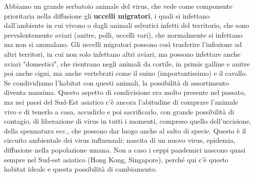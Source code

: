   Abbiamo un grande serbatoio animale del virus, che vede come
  componente prioritaria nella diffusione gli \textbf{uccelli
  migratori}, i quali si infettano dall'ambiente in cui vivono o dagli
  animali selvatici infetti del territorio, che sono prevalentemente
  aviari (anitre, polli, uccelli vari), che normalmente si infettano ma
  non si ammalano. Gli uccelli migratori possono così trasferire
  l'infezione ad altri territori, in cui non solo infettano altri
  aviari, ma possono infettare anche aviari "domestici", che rientrano
  negli animali da cortile, in primis galline e anitre poi anche cigni,
  ma anche vertebrati come il suino (importantissimo) e il cavallo. Se
  condividiamo l'habitat con questi animali, la possibilità di
  assortimento diventa massima. Questo aspetto di condivisione era molto
  presente nel passato, ma nei paesi del Sud-Est asiatico c'è ancora
  l'abitudine di comprare l'animale vivo e di tenerlo a casa, accudirlo
  e poi sacrificarlo, con grande possibilità di contagio, di liberazione
  di virus in tutti i momenti, compreso quello dell'uccisione, della
  spennatura ecc., che possono dar luogo anche al salto di specie.
  Questo è il circuito ambientale dei virus influenzali: nascita di un
  nuovo virus, epidemia, diffusione nella popolazione umana. Non a caso
  i ceppi pandemici nascono quasi sempre nel Sud-est asiatico (Hong
  Kong, Singapore), perché qui c'è questo habitat ideale e questa
  possibilità di cambiamento.
